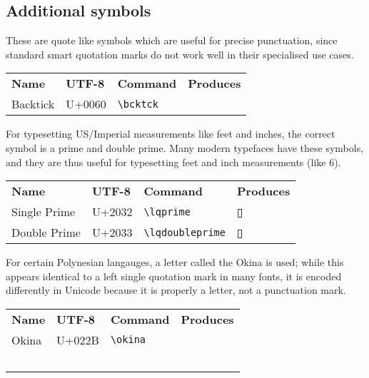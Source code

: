 \documentclass{article}
\newcommand{\primeback}{}
\newcommand{\thebox}{{\boxy ▯}}
\begin{document}
\subsection{Additional symbols}
These are quote like symbols which are useful for precise punctuation, since standard smart quotation marks do not work well in their specialised use cases.  


\begin{center}
\begin{longtable}{p{3cm}p{1.5cm}p{2cm}p{2.5cm}}
\textbf{Name} & \textbf{UTF-8} & \textbf{Command} & \textbf{Produces}\\
	Backtick & \ttfamily U+0060 & \verb!\bcktck! & \Huge\bcktck\thebox
\end{longtable}
		\end{center}
For typesetting US/Imperial measurements like feet and inches, the correct symbol is a prime and double prime.  Many modern typefaces have these symbols, and they are thus useful for typesetting feet and inch measurements (like 6\primeback\lqprime{}\primeback\lqdoubleprime ). 


\begin{center}
\begin{longtable}{p{3cm}p{1.5cm}p{2.4cm}p{2.5cm}}
\textbf{Name} & \textbf{UTF-8} & \textbf{Command} & \textbf{Produces}\\
	Single Prime & \ttfamily U+2032 & \verb!\lqprime! & \Huge\thebox\lqprime\\
		Double Prime & \ttfamily U+2033 & \verb!\lqdoubleprime! & \Huge\thebox\lqdoubleprime
\end{longtable}
		\end{center}





For certain Polynesian langauges, a letter called the \okina Okina is used; while this appears identical to a left single quotation mark in many fonts, it is encoded differently in Unicode because it is properly a letter, not a punctuation mark. 

	
	
	
	\begin{center}
\begin{longtable}{p{3cm}p{1.5cm}p{2cm}p{2.5cm}}
\textbf{Name} & \textbf{UTF-8} & \textbf{Command} & \textbf{Produces}\\
	Okina & \ttfamily U+022B & \verb!\okina! & \Huge\okina\thebox\\\


\end{longtable}
\end{center}
	
\end{document}
